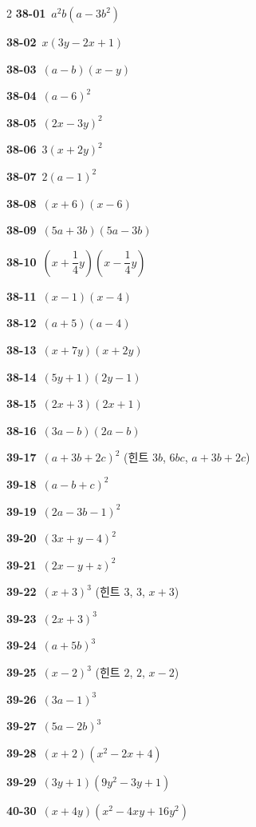 \documentclass[10pt,a4paper]{article}
\begin{document}
\begin{multicols}{2}
\noindent\textbf{38-01}\ $a^2b(a-3b^2)$\par
\noindent\textbf{38-02}\ $x(3y-2x+1)$\par
\noindent\textbf{38-03}\ $(a-b)(x-y)$\par
\noindent\textbf{38-04}\ $(a-6)^2$\par
\noindent\textbf{38-05}\ $(2x-3y)^2$\par
\noindent\textbf{38-06}\ $3(x+2y)^2$\par
\noindent\textbf{38-07}\ $2(a-1)^2$\par
\noindent\textbf{38-08}\ $(x+6)(x-6)$\par
\noindent\textbf{38-09}\ $(5a+3b)(5a-3b)$\par
\noindent\textbf{38-10}\ $\left(x+\dfrac{1}{4}y\right)\left(x-\dfrac{1}{4}y\right)$\par
\noindent\textbf{38-11}\ $(x-1)(x-4)$\par
\noindent\textbf{38-12}\ $(a+5)(a-4)$\par
\noindent\textbf{38-13}\ $(x+7y)(x+2y)$\par
\noindent\textbf{38-14}\ $(5y+1)(2y-1)$\par
\noindent\textbf{38-15}\ $(2x+3)(2x+1)$\par
\noindent\textbf{38-16}\ $(3a-b)(2a-b)$\par
\noindent\textbf{39-17}\ $(a+3b+2c)^2$ (힌트 $3b$, $6bc$, $a+3b+2c$)\par
\noindent\textbf{39-18}\ $(a-b+c)^2$\par
\noindent\textbf{39-19}\ $(2a-3b-1)^2$\par
\noindent\textbf{39-20}\ $(3x+y-4)^2$\par
\noindent\textbf{39-21}\ $(2x-y+z)^2$\par
\noindent\textbf{39-22}\ $(x+3)^3$ (힌트 $3$, $3$, $x+3$)\par
\noindent\textbf{39-23}\ $(2x+3)^3$\par
\noindent\textbf{39-24}\ $(a+5b)^3$\par
\noindent\textbf{39-25}\ $(x-2)^3$ (힌트 $2$, $2$, $x-2$)\par
\noindent\textbf{39-26}\ $(3a-1)^3$\par
\noindent\textbf{39-27}\ $(5a-2b)^3$\par
\noindent\textbf{39-28}\ $(x+2)(x^2-2x+4)$\par
\noindent\textbf{39-29}\ $(3y+1)(9y^2-3y+1)$\par
\noindent\textbf{40-30}\ $(x+4y)(x^2-4xy+16y^2)$\par

\end{multicols}
\end{document}
